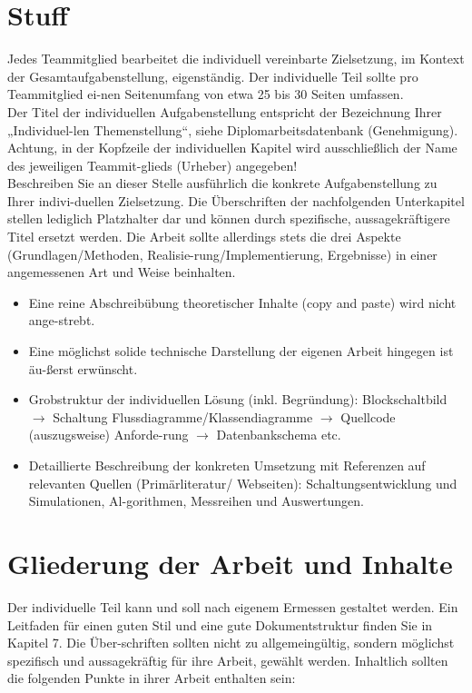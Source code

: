 \documentclass[12pt]{article}
\begin{document}
\color{black}
\newpage
\section{Stuff}

\color{blue}
Jedes Teammitglied bearbeitet die individuell vereinbarte Zielsetzung, im Kontext der Gesamtaufgabenstellung, eigenständig. Der individuelle Teil sollte pro Teammitglied ei-nen Seitenumfang von etwa 25 bis 30 Seiten umfassen.\\
Der Titel der individuellen Aufgabenstellung entspricht der Bezeichnung Ihrer „Individuel-len Themenstellung“, siehe Diplomarbeitsdatenbank (Genehmigung). Achtung, in der Kopfzeile der individuellen Kapitel wird ausschließlich der Name des jeweiligen Teammit-glieds (Urheber) angegeben!\\
Beschreiben Sie an dieser Stelle ausführlich die konkrete Aufgabenstellung zu Ihrer indivi-duellen Zielsetzung. Die Überschriften der nachfolgenden Unterkapitel stellen lediglich Platzhalter dar und können durch spezifische, aussagekräftigere Titel ersetzt werden. Die Arbeit sollte allerdings stets die drei Aspekte (Grundlagen/Methoden, Realisie-rung/Implementierung, Ergebnisse) in einer angemessenen Art und Weise beinhalten.\\

\begin{itemize}
    \item Eine reine Abschreibübung theoretischer Inhalte (copy and paste) wird nicht ange-strebt.
    \item Eine möglichst solide technische Darstellung der eigenen Arbeit hingegen ist äu-ßerst erwünscht.
    \item Grobstruktur der individuellen Lösung (inkl. Begründung): Blockschaltbild \(\rightarrow\) Schaltung  Flussdiagramme/Klassendiagramme \(\rightarrow\) Quellcode (auszugsweise) \textbar Anforde-rung \(\rightarrow\) Datenbankschema \textbar etc.
    \item Detaillierte Beschreibung der konkreten Umsetzung mit Referenzen auf relevanten Quellen (Primärliteratur/ Webseiten): Schaltungsentwicklung und Simulationen, Al-gorithmen, Messreihen und Auswertungen.
\end{itemize}

\section*{Gliederung der Arbeit und Inhalte}
Der individuelle Teil kann und soll nach eigenem Ermessen gestaltet werden. Ein Leitfaden für einen guten Stil und eine gute Dokumentstruktur finden Sie in Kapitel 7. Die Über-schriften sollten nicht zu allgemeingültig, sondern möglichst spezifisch und aussagekräftig für ihre Arbeit, gewählt werden. Inhaltlich sollten die folgenden Punkte in ihrer Arbeit enthalten sein:
\end{document}
